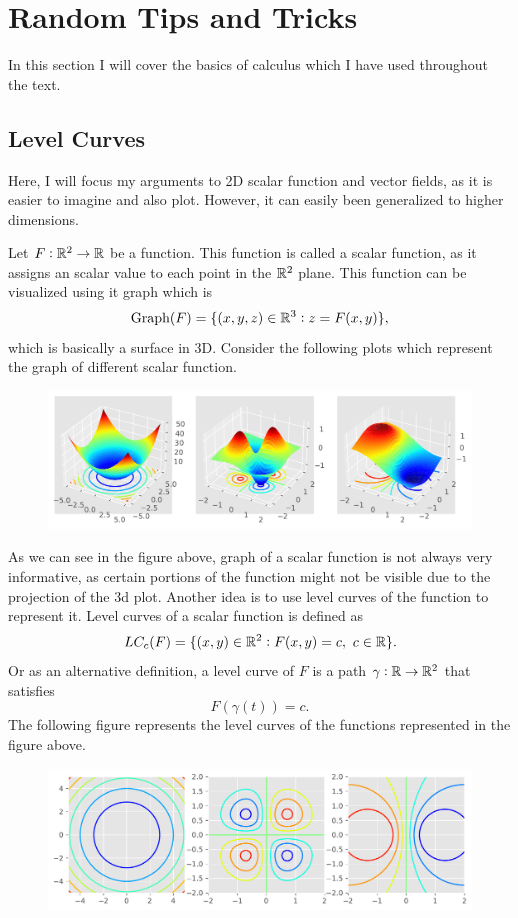 \section{Random Tips and Tricks}

In this section I will cover the basics of calculus which I have used throughout the text. 

\subsection{Level Curves}
Here, I will focus my arguments to 2D scalar function and vector fields, as it is easier to imagine and also plot. However, it can easily been generalized to higher dimensions. 

Let $F: \mathbb{R}^2 \to \mathbb{R}$ be a function. This function is called a scalar function, as it assigns an scalar value to each point in the $\mathbb{R}^2$ plane. This function can be visualized using it graph which is 
\[ \text{Graph}(F) = \{ (x,y,z) \in \mathbb{R}^3: z = F(x,y) \}, \]
which is basically a surface in 3D. Consider the following plots which represent the graph of different scalar function.

\begin{figure}[h!]
\centering
\includegraphics[width=1\linewidth]{Images/ScalarFunctions}
\end{figure}

As we can see in the figure above, graph of a scalar function is not always very informative, as certain portions of the function might not be visible due to the projection of the 3d plot. Another idea is to use level curves of the function to represent it. Level curves of a scalar function is defined as
\[ LC_c(F) = \{ (x,y)\in\mathbb{R}^2: F(x,y)=c,\ c\in \mathbb{R} \}. \]
Or as an alternative definition, a level curve of $F$ is a path $\gamma:\mathbb{R}\to\mathbb{R}^2$ that satisfies
\[ F(\gamma(t)) = c. \]
The following figure represents the level curves of the functions represented in the figure above.

\begin{figure}[h!]
	\centering
	\includegraphics[width=1\linewidth]{Images/ScalarFunctionsLevelCurves.pdf}
\end{figure}

